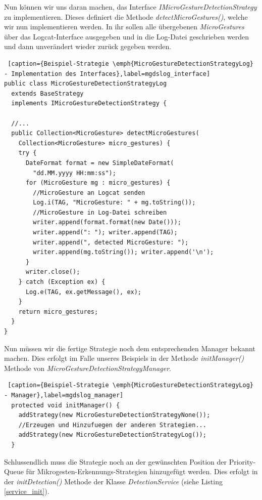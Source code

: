 Nun können wir uns daran machen, das Interface \emph{IMicroGestureDetectionStrategy} zu implementieren. Dieses definiert die Methode \emph{detectMicroGestures()}, welche wir nun implementieren werden. In ihr sollen alle übergebenen \emph{MicroGestures} über das Logcat-Interface ausgegeben und in die Log-Datei geschrieben werden und dann unverändert wieder zurück gegeben werden.

\begin{lstlisting} [caption={Beispiel-Strategie \emph{MicroGestureDetectionStrategyLog} - Implementation des Interfaces},label=mgdslog_interface]
public class MicroGestureDetectionStrategyLog 
  extends BaseStrategy 
  implements IMicroGestureDetectionStrategy {

  //...
  public Collection<MicroGesture> detectMicroGestures(
    Collection<MicroGesture> micro_gestures) {
    try {
      DateFormat format = new SimpleDateFormat(
        "dd.MM.yyyy HH:mm:ss");
      for (MicroGesture mg : micro_gestures) {
        //MicroGesture an Logcat senden
        Log.i(TAG, "MicroGesture: " + mg.toString());
        //MicroGesture in Log-Datei schreiben
        writer.append(format.format(new Date()));
        writer.append(": "); writer.append(TAG);
        writer.append(", detected MicroGesture: ");
        writer.append(mg.toString()); writer.append('\n');
      }
      writer.close();
    } catch (Exception ex) {
      Log.e(TAG, ex.getMessage(), ex);
    }
    return micro_gestures;
  }
}
\end{lstlisting}

Nun müssen wir die fertige Strategie noch dem entsprechenden Manager bekannt machen. Dies erfolgt im Falle unseres Beispiels in der Methode \emph{initManager()} Methode von \emph{MicroGestureDetectionStrategyManager}.

\begin{lstlisting} [caption={Beispiel-Strategie \emph{MicroGestureDetectionStrategyLog} - Manager},label=mgdslog_manager]
  protected void initManager() {
    addStrategy(new MicroGestureDetectionStrategyNone());
    //Erzeugen und Hinzufuegen der anderen Strategien...
    addStrategy(new MicroGestureDetectionStrategyLog());
  }
\end{lstlisting}

Schlussendlich muss die Strategie noch an der gewünschten Position der Priority-Queue für Mikrogesten-Erkennungs-Strategien hinzugefügt werden. Dies erfolgt in der \emph{initDetection()} Methode der Klasse \emph{DetectionService} (siehe Listing \ref{service_init}).

